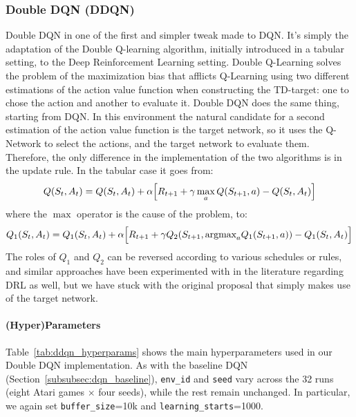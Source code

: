 \subsubsection{Double DQN (DDQN)}
\label{subsubsec:double_dqn}
Double DQN in one of the first and simpler tweak made to DQN. It's simply the adaptation of the Double Q-learning algorithm, initially introduced in a tabular setting, to the Deep Reinforcement Learning setting. Double Q-Learning solves the problem of the maximization bias that afflicts Q-Learning using two different estimations of the action value function when constructing the TD-target: one to chose the action and another to evaluate it. Double DQN does the same thing, starting from DQN. In this environment the natural candidate for a second estimation of the action value function is the target network, so it uses the Q-Network to select the actions, and the target network to evaluate them. Therefore, the only difference in the implementation of the two algorithms is in the update rule. In the tabular case it goes from:
$$Q(S_t, A_t) = Q(S_t, A_t) + \alpha \Bigl[ R_{t+1} + \gamma\max_{a} Q(S_{t+1}, a) - Q(S_t, A_t) \Bigr]$$
where the $\max$ operator is the cause of the problem, to:
$$Q_1(S_t, A_t) = Q_1(S_t, A_t) + \alpha \Bigl[ R_{t+1} + \gamma Q_2(S_{t+1}, \text{argmax}_a Q_1(S_{t+1}, a)) - Q_1(S_t, A_t) \Bigr]$$
The roles of $Q_1$ and $Q_2$ can be reversed according to various schedules or rules, and similar approaches have been experimented with in the literature regarding DRL as well, but we have stuck with the original proposal that simply makes use of the target network.

\paragraph{(Hyper)Parameters}
Table~\ref{tab:ddqn_hyperparams} shows the main hyperparameters used in our Double DQN implementation.  
As with the baseline DQN (Section~\ref{subsubsec:dqn_baseline}), \texttt{env\_id} and \texttt{seed} vary across the 32 runs (eight Atari games $\times$ four seeds), while the rest remain unchanged. In particular, we again set \texttt{buffer\_size}=10k and \texttt{learning\_starts}=1000. 

